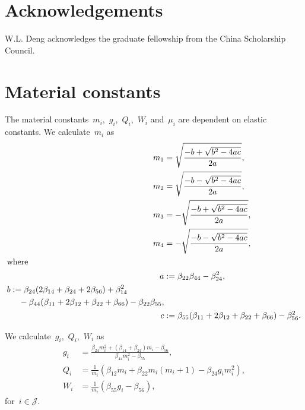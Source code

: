 \documentclass[preprint,10pt,times]{elsarticle}
\numberwithin{equation}{section}
\newcommand{\pr}[1]{\left( #1 \right)}
\renewcommand{\>}{$\Rightarrow$}
\begin{document}
\section*{Acknowledgements}
W.L. Deng acknowledges the graduate fellowship from the China Scholarship Council.


\newpage
\appendix

\section{Material constants}
\label{Appen:MatConst}
The material constants~$m_i$,~$g_i$,~$Q_i$,~$W_i$ and~$\mu_i$ are dependent on elastic constants.
We calculate~$m_i$ as
\begin{subequations}
	\begin{align}
	 m_1 & =  \sqrt{\frac{-b +\sqrt{b^2 - 4ac}}{2a}}, \\
	 m_2 & =  \sqrt{\frac{-b -\sqrt{b^2 - 4ac}}{2a}}, \\
	 m_3 & =  -\sqrt{\frac{-b +\sqrt{b^2 - 4ac}}{2a}}, \\
	 m_4 & =  -\sqrt{\frac{-b -\sqrt{b^2 - 4ac}}{2a}}, \\
	\intertext{where}
	 a & :=  \beta_{22} \beta_{44} - \beta_{24}^2, \\
	\begin{split}
	 b & := \beta_{24}(2\beta_{14} + \beta_{24} + 2\beta_{56}) + \beta_{14}^2 \\ 
	 & \quad - \beta_{44}(\beta_{11} + 2\beta_{12} + \beta_{22} + \beta_{66}) - \beta_{22} \beta_{55},
	\end{split} \\
	c & :=  \beta_{55}(\beta_{11} + 2\beta_{12} + \beta_{22} + \beta_{66})-\beta_{56}^2.
	\end{align}
\end{subequations}

We calculate~$g_i$,~$Q_i$,~$W_i$ as
\begin{subequations}
	\begin{align}
	g_i & = \frac{\beta_{24}m_i^2+(\beta_{14} + \beta_{24})m_i - \beta_{56}}{\beta_{44}m_i^2 - \beta_{55}}, \\
	Q_i & = \frac{1}{m_i} \pr{\beta_{12}m_i + \beta_{22}m_i(m_i+1) - \beta_{24} g_i m_i^2}, \\
	W_i & = \frac{1}{m_i}\pr{\beta_{55} g_i - \beta_{56}},
	\end{align}
\end{subequations}
for~$ i \in \mathcal{J}$.
\end{document}
